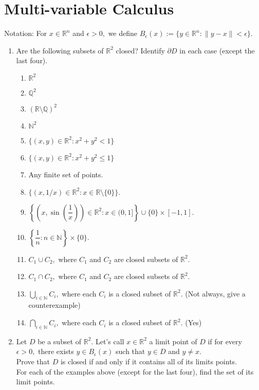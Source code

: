 \documentclass{article}
\begin{document}
\section{Multi-variable Calculus}
Notation: For $x \in \mathbb{R}^n$ and $\epsilon > 0,$ we define $B_\epsilon(x) := \{y \in \mathbb{R}^n : \|y - x\| < \epsilon\}.$
\begin{enumerate} 
	\item Are the following subsets of $\mathbb{R}^2$ closed? Identify $\partial D$ in each case (except the last four).
	\begin{enumerate}[nosep] 
		\item $\mathbb{R}^2$
		\item $\mathbb{Q}^2$
		\item $(\mathbb{R}\setminus\mathbb{Q})^2$
		\item $\mathbb{N}^2$
		\item $\{(x, y)\in\mathbb{R}^2 : x^2 + y^2 < 1\}$
		\item $\{(x, y)\in\mathbb{R}^2 : x^2 + y^2 \le 1\}$
		\item Any finite set of points.
		\item $\{(x, 1/x) \in \mathbb{R}^2 : x \in \mathbb{R}\setminus\{0\}\}.$
		\item $\left\{\left(x, \sin\left(\dfrac{1}{x}\right)\right) \in \mathbb{R}^2: x \in (0, 1]\right\} \cup \{0\}\times[-1, 1].$
		\item $\left\{\dfrac{1}{n} : n \in \mathbb{N}\right\}\times\{0\}.$
		\item $C_1 \cup C_2,$ where $C_1$ and $C_2$ are closed subsets of $\mathbb{R}^2.$
		\item $C_1 \cap C_2,$ where $C_1$ and $C_2$ are closed subsets of $\mathbb{R}^2.$
		\item $\displaystyle\bigcup_{i \in \mathbb{N}}C_i,$ where each $C_i$ is a closed subset of $\mathbb{R}^2.$ \hfill (Not always, give a counterexample)
		\item $\displaystyle\bigcap_{i \in \mathbb{N}}C_i,$ where each $C_i$ is a closed subset of $\mathbb{R}^2.$ \hfill (Yes)
	\end{enumerate}
	\item Let $D$ be a subset of $\mathbb{R}^2.$ Let's call $x \in \mathbb{R}^2$ a limit point of $D$ if for every $\epsilon > 0,$ there exists $y \in B_\epsilon(x)$ such that $y \in D$ and $y \neq x.$\\
	Prove that $D$ is closed if and only if it contains all of its limits points.\\
	For each of the examples above (except for the last four), find the set of its limit points.

\end{enumerate}
\end{document}
